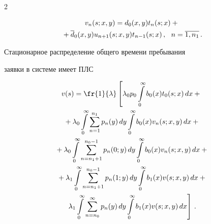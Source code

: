 \begin{multicols}{2}
\vspace*{-20pt}





\noindent


\begin{multline*}


v_{n}(s;x,y)= d_0(x,y) t_{n}(s;x) + {}\\


{}+\d_0(x,y) u_{n+1}(s;x,y) t_{n-1}(s;x)\,,


\ \ n=\overline{1,n_1}\,.


\end{multline*}







Стационарное распределение общего времени пребывания


заявки в системе имеет ПЛС


\begin{multline*}


v(s) = \fr{1}{\lambda} \left[


\lambda_0 p_0 \int\limits_0^\infty b_0(x) t_0(s;x) \, dx


+ {}\right.\\


{}+\lambda_0 \int\limits_0^\infty \sum\limits_{n=1}^{n_1} p_n(y) \, dy


\int\limits_0^\infty b_0(x) v_n(s;x,y) \, dx +{}


\\


{}+


\lambda_0 \int\limits_0^\infty \sum\limits_{n=n_1+1}^{n_0-1}


p_n(0;y)\, dy \int\limits_0^\infty b_0(x) v_n(s;x,y) \, dx


+{}


\\


{}+


\lambda_1 \int\limits_0^\infty \sum\limits_{n=n_1+1}^{n_0-1}


p_n(1;y)\, dy \int\limits_0^\infty b_1(x) v(s;x,y) \, dx


+{}\\


\left. \lambda_1 \int\limits_0^\infty \sum\limits_{n=n_0}^{\infty}


p_n(y)\, dy \int\limits_0^\infty b_1(x) v(s;x,y)\, dx


\right]\,.



\end{multline*}
\end{multicols}
